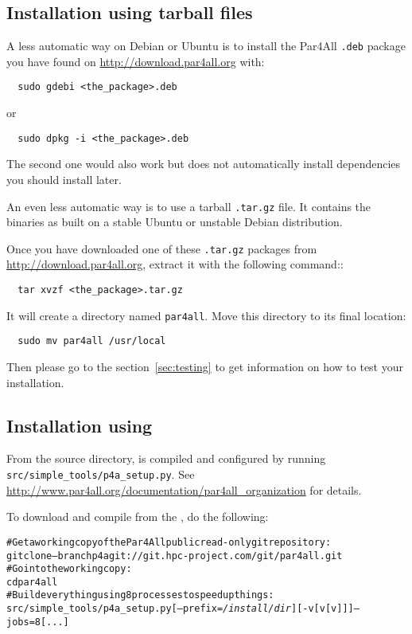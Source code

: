 \documentclass[a4paper]{article}
\begin{document}
\subsection{Installation using tarball files}

A less automatic way on Debian or Ubuntu is to install the Par4All
\texttt{.deb} package you have found on \url{http://download.par4all.org} with:
\begin{verbatim}
  sudo gdebi <the_package>.deb
\end{verbatim}
or 
\begin{verbatim}
  sudo dpkg -i <the_package>.deb 
\end{verbatim}

The second one would also work but does not
automatically install dependencies you should install later.

An even less automatic way is to use a tarball \texttt{.tar.gz} file. It
contains the binaries as built on a stable Ubuntu or unstable Debian
distribution.

Once you have downloaded one of these \texttt{.tar.gz} packages from
\url{http://download.par4all.org}, extract it with the following command::
\begin{verbatim}
  tar xvzf <the_package>.tar.gz
\end{verbatim}

It will create a directory named \texttt{par4all}. Move this directory to its final
location:
\begin{verbatim}
  sudo mv par4all /usr/local
\end{verbatim}

Then please go to the section~\ref{sec:testing} to get information on how to test 
your installation.

\subsection{ Installation using \protect\Agit}

From the \Apfa source directory, \Apfa is compiled and configured
by running \verb|src/simple_tools/p4a_setup.py|. See
\url{http://www.par4all.org/documentation/par4all_organization} for details.

To download and compile \Apfa from the \Agit, do the following:
\begin{alltt}
# Get a working copy of the Par4All public read-only git repository:
git clone --branch p4a git://git.hpc-project.com/git/par4all.git
# Go into the working copy:
cd par4all
# Build everything using 8 processes to speed up things:
src/simple_tools/p4a_setup.py [--prefix=\emph{/install/dir}] [-v[v[v]]] --jobs=8 [...]
\end{alltt}%
\end{document}
